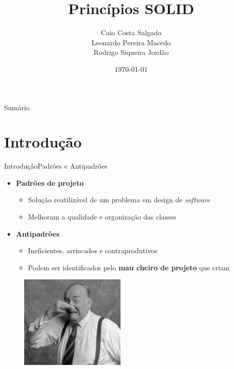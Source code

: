 \documentclass[10pt]{beamer}
\title[] { 
\textbf{Princípios SOLID}
}
\subtitle[Princípios SOLID] {
}
\author[Seminário POO] {
Caio Costa Salgado \\
Leonardo Pereira Macedo \\
Rodrigo Siqueira Jordão
}
\institute[] {
Instituto de Matemática e Estatística \\
Universidade de São Paulo \\

}
\date{\today}
\begin{document}

{\1%
\begin{frame} 
  \titlepage %
\end{frame}
}

\begin{frame}{Sumário}{}
  \tableofcontents
\end{frame}

\section{Introdução}

\begin{frame}{Introdução}{Padrões e Antipadrões}

\begin{itemize}
  \item \textbf{Padrões de projeto}
  \begin{itemize}
    \item Solução reutilizável de um problema em design de \textit{software}
    \item Melhoram a qualidade e organização das classes
  \end{itemize}
  \pause
  \item \textbf{Antipadrões}
  \begin{itemize}
    \item Ineficientes, arriscados e contraprodutivos
    \item Podem ser identificados pelo \textbf{mau cheiro de projeto} que criam
  \end{itemize}
\end{itemize}

\begin{figure}[cheiroProjeto]
  \includegraphics[width=0.45\textwidth]{images/codeSmell.jpg}
\end{figure}

\end{frame}
\end{document}

